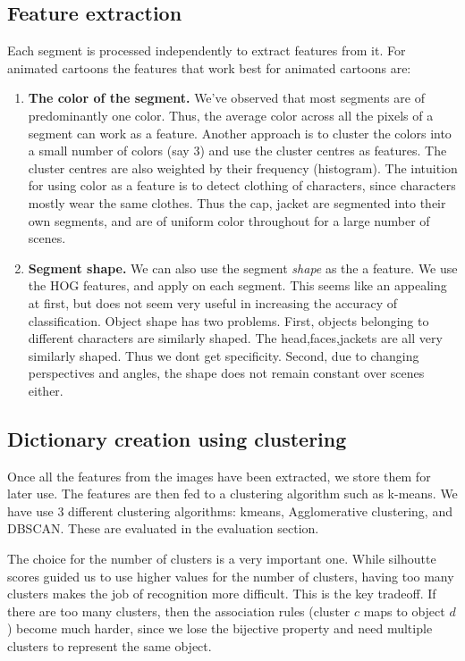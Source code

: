 \documentclass[10pt,twocolumn,letterpaper]{article}
\begin{document}
\subsection{Feature extraction}
Each segment is processed independently to extract features from
it. For animated cartoons the features that work best for animated
cartoons are:
\begin{enumerate}
\item \textbf{The color of the segment. } We've observed that most
  segments are of predominantly one color. Thus, the average color
  across all the pixels of a segment can work as a feature. Another
  approach is to cluster the colors into a small number of colors (say
  3) and use the cluster centres as features. The cluster centres are
  also weighted by their frequency (histogram).  The intuition for
  using color as a feature is to detect clothing of characters, since
  characters mostly wear the same clothes. Thus the cap, jacket are
  segmented into their own segments, and are of uniform color
  throughout for a large number of scenes.

\item \textbf{Segment shape. } We can also use the segment
  \emph{shape} as the a feature. We use the HOG features, and apply on
  each segment. This seems like an appealing at first, but does not
  seem very useful in increasing the accuracy of
  classification. Object shape has two problems. First, objects
  belonging to different characters are similarly shaped. The
  head,faces,jackets are all very similarly shaped. Thus we dont get
  specificity. Second, due to changing perspectives and angles, the
  shape does not remain constant over scenes either. 

\end{enumerate}

\subsection{Dictionary creation using clustering} 

Once all the features from the images have been extracted, we store
them for later use. The features are then fed to a clustering
algorithm such as k-means. We have use 3 different clustering
algorithms: kmeans, Agglomerative clustering, and DBSCAN. These are
evaluated in the evaluation section.

The choice for the number of clusters is a very important one. While
silhoutte scores guided us to use higher values for the number of
clusters, having too many clusters makes the job of recognition more
difficult. This is the key tradeoff. If there are too many clusters,
then the association rules (cluster $c$ maps to object $d$) become
much harder, since we lose the bijective property and need multiple
clusters to represent the same object.
\end{document}
